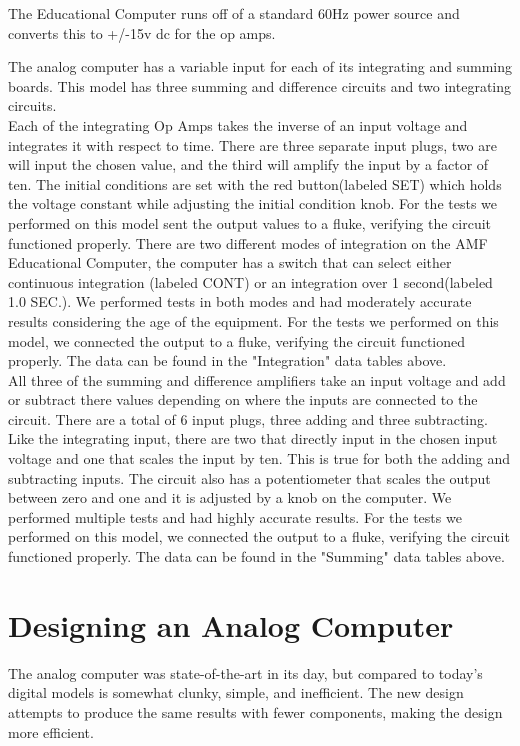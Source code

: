 \documentclass[11pt]{article}
\begin{document}
	The Educational Computer runs off of a standard 60Hz power source and converts this to +/-15v dc for the op amps. 
	
	The analog computer has a variable input for each of its integrating and summing boards. This model has three summing and difference circuits and two integrating circuits. \\
	
	Each of the integrating Op Amps takes the inverse of an input voltage and integrates it with respect to time. There are three separate input plugs, two are will input the chosen value, and the third will amplify the input by a factor of ten. The initial conditions are set with the red button(labeled SET) which holds the voltage constant while adjusting the initial condition knob. For the tests we performed on this model sent the output values to a fluke, verifying the circuit functioned properly. There are two different modes of integration on the AMF Educational Computer, the computer has a switch that can select either continuous integration (labeled CONT) or an integration over 1 second(labeled 1.0 SEC.). We performed tests in both modes and had moderately accurate results considering the age of the equipment. For the tests we performed on this model, we connected the output to a fluke, verifying the circuit functioned properly. The data can be found in the "Integration" data tables above. \\
	
	All three of the summing and difference amplifiers take an input voltage and add or subtract there values depending on where the inputs are connected to the circuit. There are a total of 6 input plugs, three adding and three subtracting. Like the integrating input, there are two  that directly input in the chosen input voltage and one that scales the input by ten. This is true for both the adding and subtracting inputs. The circuit also has a potentiometer that scales the output between zero and one and it is adjusted by a knob on the computer. We performed multiple tests and had highly accurate results. For the tests we performed on this model, we connected the output to a fluke, verifying the circuit functioned properly. The data can be found in the "Summing" data tables above.
	
	\section*{Designing an Analog Computer}
	The analog computer was state-of-the-art in its day, but compared to today's digital models is somewhat clunky, simple, and inefficient. The new design attempts to produce the same results with fewer components, making the design more efficient.
	
\end{document}
